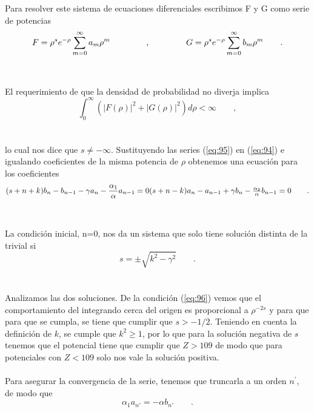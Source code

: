 \documentclass[11pt,letterpaper]{article}     %
\begin{document}
Para resolver este sistema de ecuaciones diferenciales escribimos F y G como serie de potencias
\begin{equation} \label{eq:96}
F=\rho^s e^{-\rho} \sum_{m=0}^{\infty} a_m \rho^m \hspace{1.5cm}, \hspace{1.5cm} G=\rho^s e^{-\rho} \sum_{m=0}^{\infty} b_m \rho^m \qquad .
\end{equation} \\ \\
El requerimiento de que la densidad de probabilidad no diverja implica
\begin{equation} \label{eq:97}
\int_{0}^{\infty} \left( |F(\rho)|^2 + |G(\rho)|^2\right)d \rho < \infty \qquad ,
\end{equation} \\ \\
lo cual nos dice que $s\neq - \infty$. Sustituyendo las series (\ref{eq:95}) en (\ref{eq:94}) e igualando coeficientes de la misma potencia de $\rho$ obtenemos una ecuación para los coeficientes
\begin{equation} \label{eq:98}
(s+n+k)b_n-b_{n-1}-\gamma a_n - \frac{\alpha_1}{\alpha}a_{n-1}=0 $$\\$$
(s+n-k)a_n-a_{n-1}+\gamma b_n - \frac{\alpha_2}{\alpha}b_{n-1}=0 \qquad .
\end{equation} \\ \\
La condición inicial, n=0, nos da un sistema que solo tiene solución distinta de la trivial si
\begin{equation} \label{eq:99}
s=\pm \sqrt{k^2- \gamma^2} \qquad.
\end{equation} \\ \\
Analizamos las dos soluciones. De la condición (\ref{eq:96}) vemos que el comportamiento del integrando cerca del origen es proporcional a $\rho^{-2s}$ y para que para que se cumpla, se tiene que cumplir que $s>-1/2$. Teniendo en cuenta la definición de $k$, se cumple que $k^2\geq 1$, por lo que para la solución negativa de $s$ tenemos que el potencial tiene que cumplir que $Z>109$ de modo que para potenciales con $Z<109$ solo nos vale la solución positiva. \\ \\
Para asegurar la convergencia de la serie, tenemos que truncarla a un orden $n^{'}$, de modo que
\begin{equation} \label{eq:100}
\alpha_1 a_{n'}= - \alpha b_{n'} \qquad .
\end{equation} \\ \\
\end{document}
